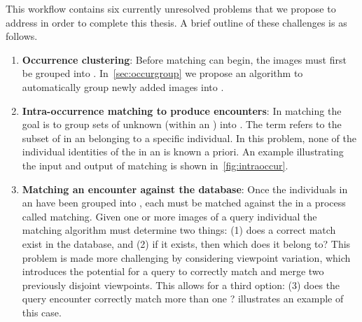     This workflow contains six currently unresolved problems that we propose
      to address in order to complete this thesis.
    A brief outline of these challenges is as follows.
    \begin{enumerate}

        \item \textbf{Occurrence clustering}:
            Before \intraoccurrence{} matching can begin, the images must
              first be grouped into \occurrences{}.
            In~\cref{sec:occurgroup} we propose an algorithm to automatically
              group newly added images into \occurrences{}.

        \item \textbf{Intra-occurrence matching to produce encounters}:
            In \intraoccurrence{} matching the goal is to group sets of
              unknown \annots{} (within an \occurrence{}) into \encounters{}.
            The term \glossterm{\encounter{}} refers to the subset of
              \annots{} in an \occurrence{} belonging to a specific individual.
            In this problem, none of the individual identities of the
              \annots{} in an \occurrence{} is known a priori.
            An example illustrating the input and output of \intraoccurrence{}
              matching is shown in~\cref{fig:intraoccur}.

            \intraoccur{}

        \item \textbf{Matching an encounter against the database}:
            Once the individuals in an \occurrence{} have been grouped into
              \encounters{}, each \encounter{} must be matched against the
              \masterdatabase{} in a process called \vsexemplar{} matching.
            Given one or more images of a query individual the matching
              algorithm must determine two things:
            (1) does a correct match exist in the database, and
            (2) if it exists, then which \name{} does it belong to?
            This problem is made more challenging by considering viewpoint
              variation, which introduces the potential for a query to correctly
              match and merge two previously disjoint viewpoints.
            This allows for a third option:
            (3) does the query encounter correctly match more than one
              \name{}?
             illustrates an example of this case.


\end{enumerate}
